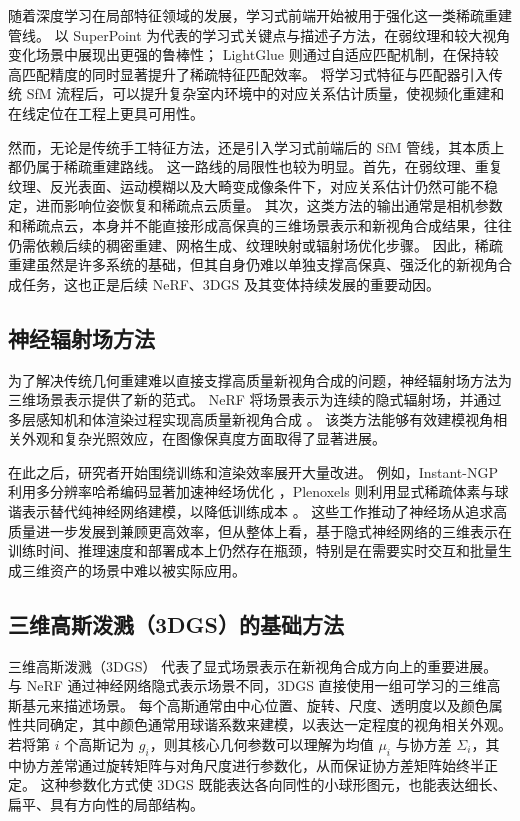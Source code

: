 随着深度学习在局部特征领域的发展，学习式前端开始被用于强化这一类稀疏重建管线。
以 SuperPoint \cite{detone2018superpoint} 为代表的学习式关键点与描述子方法，在弱纹理和较大视角变化场景中展现出更强的鲁棒性；
LightGlue \cite{lindenberger2023lightglue} 则通过自适应匹配机制，在保持较高匹配精度的同时显著提升了稀疏特征匹配效率。
将学习式特征与匹配器引入传统 SfM 流程后，可以提升复杂室内环境中的对应关系估计质量，使视频化重建和在线定位在工程上更具可用性。

然而，无论是传统手工特征方法，还是引入学习式前端后的 SfM 管线，其本质上都仍属于稀疏重建路线。
这一路线的局限性也较为明显。首先，在弱纹理、重复纹理、反光表面、运动模糊以及大畸变成像条件下，对应关系估计仍然可能不稳定，进而影响位姿恢复和稀疏点云质量。
其次，这类方法的输出通常是相机参数和稀疏点云，本身并不能直接形成高保真的三维场景表示和新视角合成结果，往往仍需依赖后续的稠密重建、网格生成、纹理映射或辐射场优化步骤。
因此，稀疏重建虽然是许多系统的基础，但其自身仍难以单独支撑高保真、强泛化的新视角合成任务，这也正是后续 NeRF、3DGS 及其变体持续发展的重要动因。

\subsection{神经辐射场方法}

为了解决传统几何重建难以直接支撑高质量新视角合成的问题，神经辐射场方法为三维场景表示提供了新的范式。
NeRF 将场景表示为连续的隐式辐射场，并通过多层感知机和体渲染过程实现高质量新视角合成 \cite{mildenhall2021nerf}。
该类方法能够有效建模视角相关外观和复杂光照效应，在图像保真度方面取得了显著进展。

在此之后，研究者开始围绕训练和渲染效率展开大量改进。
例如，Instant-NGP 利用多分辨率哈希编码显著加速神经场优化 \cite{muller2022instant}，Plenoxels 则利用显式稀疏体素与球谐表示替代纯神经网络建模，以降低训练成本 \cite{fridovich2022plenoxels}。
这些工作推动了神经场从追求高质量进一步发展到兼顾更高效率，但从整体上看，基于隐式神经网络的三维表示在训练时间、推理速度和部署成本上仍然存在瓶颈，特别是在需要实时交互和批量生成三维资产的场景中难以被实际应用。

\subsection{三维高斯泼溅（3DGS）的基础方法}

三维高斯泼溅（3DGS）\cite{kerbl2023} 代表了显式场景表示在新视角合成方向上的重要进展。
与 NeRF 通过神经网络隐式表示场景不同，3DGS 直接使用一组可学习的三维高斯基元来描述场景。
每个高斯通常由中心位置、旋转、尺度、透明度以及颜色属性共同确定，其中颜色通常用球谐系数来建模，以表达一定程度的视角相关外观。若将第 \(i\) 个高斯记为 \(g_i\)，则其核心几何参数可以理解为均值 \(\mu_i\) 与协方差 \(\Sigma_i\)，其中协方差常通过旋转矩阵与对角尺度进行参数化，从而保证协方差矩阵始终半正定。
这种参数化方式使 3DGS 既能表达各向同性的小球形图元，也能表达细长、扁平、具有方向性的局部结构。

